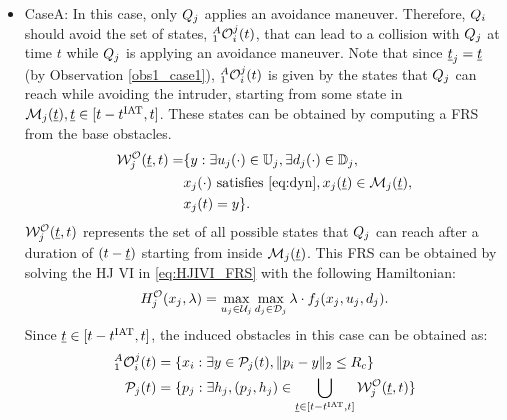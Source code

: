 \begin{itemize}[leftmargin=*] 
\item \label{sec:intruderObs_case1_caseA} CaseA: In this case, only $Q_j$ applies an avoidance maneuver. Therefore, $Q_i$ should avoid the set of states, $_1^A\mathcal{O}_i^j(t)$, that can lead to a collision with $Q_j$ at time $t$ while $Q_j$ is applying an avoidance maneuver. Note that since $\underline{t}_j = \underline{t}$ (by Observation \ref{obs1_case1}), $_1^A\mathcal{O}_i^j(t)$ is given by the states that $Q_j$ can reach while avoiding the intruder, starting from some state in $\mathcal{M}_j(\underline{t}), \underline{t} \in [t-t^\text{IAT}, t]$. These states can be obtained by computing a FRS from the base obstacles.
\begin{equation} \label{eq:ObsFRS_case1_caseA}
\begin{aligned}
\frs_{j}^{\mathcal{O}}(\tsa, t) = & \{y: \exists \ctrl_j(\cdot) \in \cfset_j, \exists \dstb_j(\cdot) \in \dfset_j, \\
& \state_j(\cdot) \text{ satisfies \eqref{eq:dyn}}, \state_j(\tsa) \in \boset_j(\tsa), \\
& \state_j(t) = y\}.
\end{aligned}
\end{equation}
$\mathcal{W}_{j}^{\mathcal{O}}(\underline{t}, t)$ represents the set of all possible states that $Q_j$ can reach after a duration of $(t-\underline{t})$ starting from inside $\mathcal{M}_j(\underline{t})$. This FRS can be obtained by solving the HJ VI in \eqref{eq:HJIVI_FRS} with the following Hamiltonian:
\begin{equation}
H_{j}^{\mathcal{O}}(x_j, \lambda) = \max_{u_j \in \mathcal{U}_j} \max_{d_j \in \mathcal{D}_j} \lambda \cdot f_j (x_j, u_j, d_j).
\end{equation} 
Since $\underline{t} \in [t-t^\text{IAT}, t]$, the induced obstacles in this case can be obtained as:
\begin{equation} \label{eq:intruderObs_case1_caseA} 
\begin{aligned}
_1^A\ioset_i^j(t) & = \{\state_i: \exists y \in \pfrs_j(t), \|\pos_i - y\|_2 \le \rc \}\\
\pfrs_j(t) & = \{p_j: \exists \npos_j, (p_j, \npos_j) \in \bigcup_{\tsa \in [t-\iat, t]} \frs_{j}^{\mathcal{O}}(\tsa, t) \}
\end{aligned}
\end{equation}


\end{itemize}
